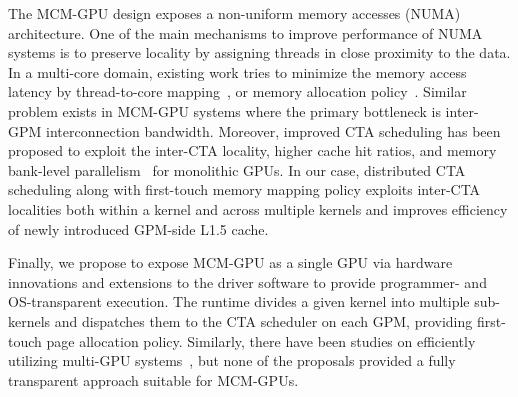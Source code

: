 The MCM-GPU design exposes a non-uniform memory accesses (NUMA)
architecture. One of the main mechanisms to improve performance of
NUMA systems is to preserve locality by assigning threads in close
proximity to the data. In a multi-core domain, existing work tries to
minimize the memory access latency by thread-to-core
mapping~\cite{tam2007thread,blagodurov2010case,li1993locality}, or
memory allocation
policy~\cite{bolosky1989simple,larowe1991exploiting,dashti2013traffic}.
Similar problem exists in MCM-GPU systems where the primary bottleneck
is inter-GPM interconnection bandwidth. Moreover, improved CTA
scheduling has been proposed to exploit the inter-CTA locality, higher
cache hit ratios, and memory bank-level
parallelism~\cite{leehpca2014,mao2016temp,wanglaperm} for monolithic
GPUs. In our case, distributed CTA scheduling along with first-touch
memory mapping policy exploits inter-CTA localities both within a
kernel and across multiple kernels and improves efficiency of newly
introduced GPM-side L1.5 cache.

Finally, we propose to expose MCM-GPU as a single GPU via hardware
innovations and extensions to the driver software to provide
programmer- and OS-transparent execution. The runtime divides a
given kernel into multiple sub-kernels and dispatches them to the CTA
scheduler on each GPM, providing first-touch page allocation policy.
Similarly, there have been studies on efficiently utilizing multi-GPU
systems~\cite{Kim2011,Cabezas2015,lee2013transparent,ben2015memory},
but none of the proposals provided a fully transparent approach
suitable for MCM-GPUs.

